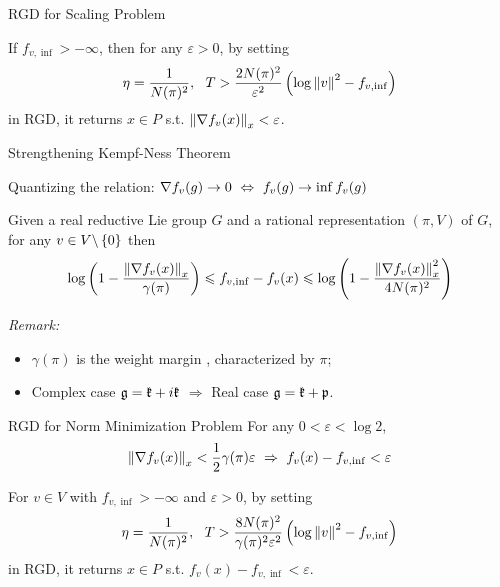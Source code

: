 \documentclass{beamer}
\begin{document}
	\begin{frame}{RGD for Scaling Problem}
		\begin{thm}
			If $f_{v,\inf} > -\infty$, then for any $\varepsilon>0$, by setting
			\vspace{-0.5em}
			\begin{equation*}
				\eta = \frac{1}{N(\pi)^2},~~T > \frac{2N(\pi)^2}{\varepsilon^2}\bc{\log \norm{v}^2-f_{v,\inf}}
				\vspace{-0.5em}
			\end{equation*}
			in RGD, it returns $x \in P$ s.t. $\left\lVert\nabla f_v(x)\right\lVert_{x} < \varepsilon$. 
		\end{thm}
	\end{frame}

	\begin{frame}{Strengthening Kempf-Ness Theorem}

		Quantizing the relation: $\nabla f_v(g) \rightarrow 0 ~\Leftrightarrow~ f_v(g) \rightarrow \inf f_v(g)$
		\vspace{0.5em}	
		\begin{thm}
			Given a real reductive Lie group $G$ and a rational representation $(\pi,V)$ of $G$, for any $v \in V \backslash \left\{0\right\}$ then
			\vspace{-0.5em}
			\begin{equation*}
				\log\left(1-\frac{\left\lVert\nabla f_v(x)\right\lVert_{x}}{\gamma(\pi)}\right) \leqslant f_{v,\inf}- f_v(x) \leqslant \log\left(1-\frac{\left\lVert\nabla f_v(x)\right\lVert_{x}^2}{4N(\pi)^2}\right)
			\end{equation*}
		\end{thm}
		\emph{Remark:}
		\begin{itemize}
			\item $\gamma(\pi)$ is the weight margin \cite{key8}, characterized by $\pi$;
			\item Complex case $\mathfrak{g} = \mathfrak{k}+i\mathfrak{k}$ $\Rightarrow$ Real case $\mathfrak{g} = \mathfrak{k}+\mathfrak{p}$.
		\end{itemize}
	\end{frame}

	\begin{frame}{RGD for Norm Minimization Problem}
		For any $0< \varepsilon < \log 2$,
		\vspace{-0.5em}
		\begin{equation*}
			\norm{\nabla f_v(x)}_{x} < \frac{1}{2}\gamma(\pi)\varepsilon~\Rightarrow~f_v(x) - f_{v,\inf} < \varepsilon
			\vspace{-0.5em}
		\end{equation*}
		\begin{thm}
			For $v \in V$ with $f_{v,\inf} > -\infty$ and $\varepsilon >0$, by setting
			\vspace{-0.5em}
			\begin{equation*}
				\eta = \frac{1}{N(\pi)^2},~~T > \frac{8N(\pi)^2}{\gamma(\pi)^2\varepsilon^2}\bc{\log \norm{v}^2-f_{v,\inf}}
				\vspace{-0.5em}
			\end{equation*}
			in RGD, it returns $x \in P$ s.t. $f_v(x) - f_{v,\inf} < \varepsilon$.
		\end{thm}
	\end{frame}
\end{document}
